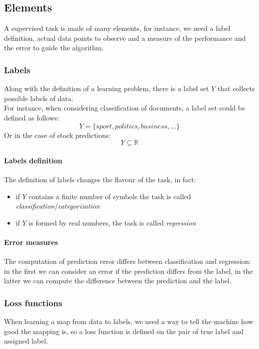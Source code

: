 \subsection{Elements}
A supervised task is made of many elements, for instance, we need a label definition, 
actual data points to observe and a measure of the performance and the error to guide the 
algorithm.

\subsubsection{Labels}
Along with the definition of a learning problem, there is a label set $Y$ that collects
possible labels of data.\\
For instance, when considering classification of documents, a label set could be defined 
as follows: 
$$Y = \{\mathit{sport}, \mathit{politics}, \mathit{business}, \dots\}$$
Or in the case of stock predictions:
$$Y \subseteq \mathbb{R}$$

\paragraph{Labels definition}
The definition of labels changes the flavour of the task, in fact:
\begin{itemize}
    \item if $Y$ contains a finite number of symbols the task 
    is called \emph{classification}/\emph{categorization}
    \item if $Y$ is formed by real numbers, the task is called \emph{regression}
\end{itemize}

\paragraph{Error measures}
The computation of prediction error differs between classification and regression:
in the first we can consider an error if the prediction differs from the label, 
in the latter we can compute the difference between the prediction and the label.

\subsubsection{Loss functions}
When learning a map from data to labels, we need a way to tell the machine how good
the mapping is, so a loss function is defined on the pair of true label and assigned label.

